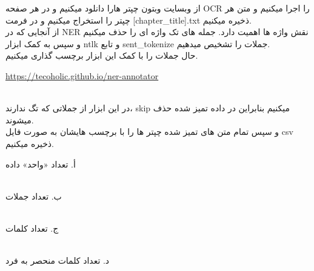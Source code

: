
از وبسایت وبتون چپتر هارا دانلود میکنیم و در هر صفحه OCR را اجرا میکنیم و متن هر چپتر را استخراج میکنیم و در فرمت  [chapter\_title].txt ذخیره میکنیم.
\\
از آنجایی که در NER نقش واژه ها اهمیت دارد. جمله های تک واژه ای را حذف میکنیم و  سپس به کمک ابزار ntlk و تابع sent\_tokenize جملات را تشخیص میدهیم.
\\
حال جملات را با کمک این ابزار برچسب گذاری میکنیم.
 \begin{latin}
 \url{https://tecoholic.github.io/ner-annotator}
 \end{latin}
\\
در این ابزار از جملاتی که تگ ندارند، skip میکنیم بنابراین در داده تمیز شده حذف میشوند.
\\
و سپس تمام متن های تمیز شده چپتر ها را با برچسب هایشان به صورت فایل csv ذخیره میکنیم.



أ. تعداد «واحد» داده
\begin{latin}
\begin{center}
  \fontsize{8pt}{9pt}\ttfamily
\end{center}
\end{latin}

\\
ب. تعداد جملات
\begin{latin}
\begin{center}
  \fontsize{8pt}{9pt}\ttfamily
\end{center}
\end{latin}

\\
\newpage
ج. تعداد کلمات
\begin{latin}
\begin{center}
  \fontsize{8pt}{9pt}\ttfamily
\end{center}
\end{latin}

\\

د. تعداد کلمات منحصر به فرد

\

\begin{latin}
\begin{center}
  \fontsize{8pt}{9pt}\ttfamily
\end{center}
\end{latin}

